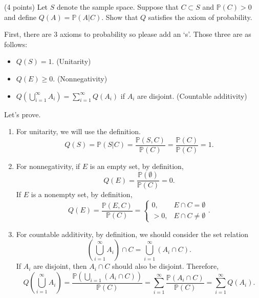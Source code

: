 \documentclass[answers]{exam}
\begin{document}
\begin{questions}
\begin{solution}
   \end{solution}
   \question
   (4 points) Let $S$ denote the sample space. Suppose that $C \subset S$ and $\mathbb{P}\left(C\right) >0$ and define $Q\left(A\right) = \mathbb{P}\left(A|C\right)$. Show that $Q$ satisfies the axiom of probability.
   \begin{solution}
   First, there are 3 axioms to probability so please add an `s'. Those three are as follows:
   \begin{itemize}
      \item $Q\left(S\right) = 1$. (Unitarity)
      \item $Q\left(E\right) \geq 0$. (Nonnegativity)
      \item $Q\left(\bigcup_{i=1}^{\infty} A_{i}\right) = \sum_{i=1}^{\infty}Q\left(A_{i}\right)$ if $A_{i}$ are disjoint. (Countable additivity)
   \end{itemize}
   Let's prove.
   \begin{enumerate}
      \item For unitarity, we will use the definition.
      $$
      Q\left(S\right) = \mathbb{P}\left(S|C\right)= \frac{\mathbb{P}\left(S,C\right)}{\mathbb{P}\left(C\right)} = \frac{\mathbb{P}\left(C\right)}{\mathbb{P}\left(C\right)} = 1.
      $$
      \item For nonnegativity, if $E$ is an empty set, by definition,
      $$
      Q\left(E\right) = \frac{\mathbb{P}\left(\emptyset\right)}{\mathbb{P}\left(C\right)} = 0.
      $$
      If $E$ is a nonempty set, by definition,
      $$
      Q\left(E\right) = \frac{\mathbb{P}\left(E,C\right)}{\mathbb{P}\left(C\right)} = \begin{cases} 0, & E\cap C=\emptyset\\ > 0, & E\cap C \neq \emptyset \end{cases}.
      $$
      \item For countable additivity, by definition, we should consider the set relation
      $$
      \left(\bigcup_{i=1}^{\infty} A_{i}\right) \cap C = \bigcup_{i=1}^{\infty} \left(A_{i}\cap C\right).
      $$
      If $A_{i}$ are disjoint, then $A_{i} \cap C$ should also be disjoint. Therefore,
      $$
      Q\left(\bigcup_{i=1}^{\infty}A_{i}\right) = \frac{\mathbb{P}\left(\bigcup_{i=1}\left(A_{i}\cap C\right) \right)}{\mathbb{P}\left(C\right)} = \sum_{i=1}^{\infty}\frac{\mathbb{P}\left(A_{i}\cap C\right)}{\mathbb{P}\left(C\right)} = \sum_{i=1}^{\infty}Q\left(A_{i}\right).
      $$
   \end{enumerate}
   \end{solution}

\end{questions}
\end{document}
